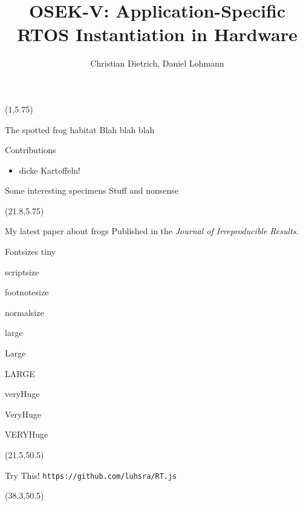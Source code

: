 \documentclass[]{beamer}
\title{OSEK-V: Application-Specific RTOS Instantiation in Hardware}
\author{Christian Dietrich, Daniel Lohmann}
\begin{document}
\begin{frame}{}

\begin{textblock}{19.5}(1,5.75)
\begin{block}{The spotted frog habitat}
Blah blah blah
\end{block}
\begin{highlightbox}{Contributions}
    \begin{itemize}
        \item dicke Kartoffeln!
    \end{itemize} 
\end{highlightbox}

\begin{block}{Some interesting specimens}
Stuff and nonsense
\end{block}
\end{textblock}

\begin{textblock}{19.3}(21.8,5.75)
\begin{block}{My latest paper about frogs}
Published in the \emph{Journal of Irreproducible Results}.
\end{block}
\end{textblock}

\begin{block}{\large Fontsizes}
  \centering
  {\tiny tiny}\par
  {\scriptsize scriptsize}\par
  {\footnotesize footnotesize}\par
  {\normalsize normalsize}\par
  {\large large}\par
  {\Large Large}\par
  {\LARGE LARGE}\par
  {\veryHuge veryHuge}\par
  {\VeryHuge VeryHuge}\par
  {\VERYHuge VERYHuge}\par
\end{block}

\begin{textblock}{16.3}(21.5,50.5)
    \begin{block}{Try This!}
        \texttt{https://github.com/luhsra/RT.js}
    \end{block}
\end{textblock}

\begin{textblock}{3}(38.3,50.5)
    
\end{textblock}

\vfill
\end{frame}
\end{document}
